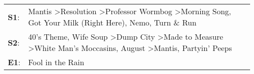 \begin{supertabular}{p{0.03\textwidth}p{0.92\textwidth}}
 \textbf{S1}:  &                                               Mantis\textsuperscript{} \textgreater \enspace Resolution\textsuperscript{} \textgreater \enspace Professor Wormbog\textsuperscript{} \textgreater \enspace Morning Song\textsuperscript{}, \enspace Got Your Milk (Right Here)\textsuperscript{}, \enspace Nemo\textsuperscript{}, \enspace Turn \& Run\textsuperscript{}  \enspace  \\
 \textbf{S2}:  &  40's Theme\textsuperscript{}, \enspace Wife Soup\textsuperscript{} \textgreater \enspace Dump City\textsuperscript{} \textgreater \enspace Made to Measure\textsuperscript{} \textgreater \enspace White Man's Moccasins\textsuperscript{}, \enspace August\textsuperscript{} \textgreater \enspace Mantis\textsuperscript{}, \enspace Partyin' Peeps\textsuperscript{}  \enspace  \\
 \textbf{E1}:  &                                                                                                                                                                                                                                                                                                                                       Fool in the Rain\textsuperscript{}  \enspace  \\
\end{supertabular}
